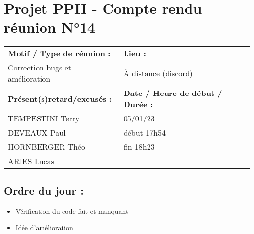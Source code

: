 \documentclass{article}
\begin{document}
\section*{Projet PPII - Compte rendu réunion N°14}
\begin{tabular}{|p{7cm}|p{6cm}|}
    \hline
    \textbf{Motif / Type de réunion :}
    & \textbf{Lieu :}
    \\
    Correction bugs et amélioration
    & 
    À distance (discord)
    \\ \hline
    \textbf{Présent(s)retard/excusés :}
    &
    \textbf{Date / Heure de début / Durée :}
    \\ 
    TEMPESTINI Terry &  05/01/23\\  
    DEVEAUX Paul & début 17h54\\
    HORNBERGER Théo & fin 18h23\\
    ARIES Lucas & 
    \\ \hline
\end{tabular}

\subsection*{Ordre du jour :}
\begin{itemize}
    \item{Vérification du code fait et manquant}
    \item{Idée d'amélioration}
\end{itemize}
\end{document}
